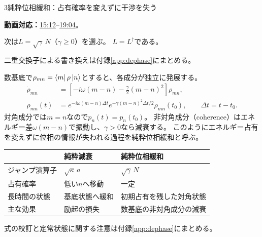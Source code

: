 \documentclass[a4paper,11pt]{ltjsarticle}
\numberwithin{equation}{section}
\newcommand{\video}[2]{\href{https://www.youtube.com/watch?v=RYxzcUhIHjk\&t=#1s}{#2}}
\newcommand{\videosource}[1]{\par\noindent\textcolor{noteblue}{\textbf{動画対応：}#1}\par\smallskip}
\begin{document}
\begin{lecturesection}{3}{純粋位相緩和：占有確率を変えずに干渉を失う}
\label{sec:dephasing}
\videosource{\video{912}{15:12}--\video{1144}{19:04}。}
次は$L=\sqrt\gamma\,N$（$\gamma\ge0$）を選ぶ。
$L=L^\dagger$である。
\par\noindent 二重交換子による書き換えは付録\ref{app:dephase}にまとめる。

数基底で$\rho_{mn}=\bra m\rho\ket n$とすると、各成分が独立に発展する。
\begin{align}
 \dot\rho_{mn}
  &=\left[-i\omega(m-n)-\frac\gamma2(m-n)^2\right]\rho_{mn},\\
 \rho_{mn}(t)
  &=e^{-i\omega(m-n)\Delta t}
    e^{-\gamma(m-n)^2\Delta t/2}\rho_{mn}(t_0),
 \qquad\Delta t=t-t_0.
 \label{eq:dephasing}
\end{align}
対角成分では$m=n$なので$p_n(t)=p_n(t_0)$。
非対角成分（coherence）はエネルギー差$\omega(m-n)$で振動し、$\gamma>0$なら減衰する。
このようにエネルギー占有を変えずに位相の情報が失われる過程を純粋位相緩和と呼ぶ。

\begin{center}
\begin{tabular}{lll}\toprule
 & 純粋減衰 & 純粋位相緩和\\\midrule
ジャンプ演算子 & $\sqrt\kappa\,a$ & $\sqrt\gamma\,N$\\
占有確率 & 低い$n$へ移動 & 一定\\
長時間の状態 & 基底状態へ緩和 & 初期占有を残した対角状態\\
主な効果 & 励起の損失 & 数基底の非対角成分の減衰\\\bottomrule
\end{tabular}
\end{center}

\par\noindent 式の校訂と定常状態に関する注意は付録\ref{app:dephase}にまとめる。

\end{lecturesection}
\end{document}
